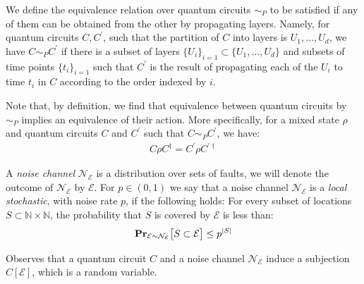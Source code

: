 \begin{definition}
We define the equivalence relation over quantum circuits $\sim_P$ to be satisfied if any of them can be obtained from the other by propagating layers. Namely, for quantum circuits $C, C^{\prime}$, such that the partition of $C$ into layers is $U_{1}, \ldots, U_{d}$, we have $C \sim_P C^{\prime}$ if there is a subset of layers $\{ U_{i} \}_{i=1} \subset \{U_{1}, \ldots, U_{d}\}$ and subsets of time points $\{ t_{i} \}_{i=1}$ such that $C^{\prime}$ is the result of propagating each of the $U_{i}$ to time $t_{i}$ in $C$ according to the order indexed by $i$.

\end{definition}
Note that, by definition, we find that equivalence between quantum circuits by $\sim_P$ implies an equivalence of their action. More specifically, for a mixed state $\rho$ and quantum circuits $C$ and $C^{\prime}$ such that $C\sim_P C^{\prime}$, we have:
\begin{equation*}
  \begin{split}
    C\rho C^{\dagger} = C^{\prime} \rho C^{\prime \dagger} 
  \end{split}
\end{equation*}
\begin{definition} 
  A \textit{noise channel} $\mathcal{N}_{\mathcal{E}}$ is a distribution over sets of faults, we will denote the outcome of $\mathcal{N}_{\mathcal{E}}$ by $\mathcal{E}$. For $p \in (0,1)$ we say that a noise channel $\mathcal{N}_{\mathcal{E}}$ is a \textit{local stochastic}, with noise rate $p$, if the following holds: 
For every subset of locations $S \subset \mathbb{N} \times \mathbb{N}$, the probability that $S$ is covered by $\mathcal{E}$ is less than:
  \begin{equation*}
    \begin{split}
      \prbm{ S \subset \mathcal{E} }{ \mathcal{E} \sim \mathcal{N}_{\mathcal{E}}} \le p^{|S|}
    \end{split}
  \end{equation*}
\end{definition}
Observes that a quantum circuit $C$ and a noise channel $\mathcal{N}_{\mathcal{E}}$ induce a subjection $C[\mathcal{E}]$, which is a random variable. 


